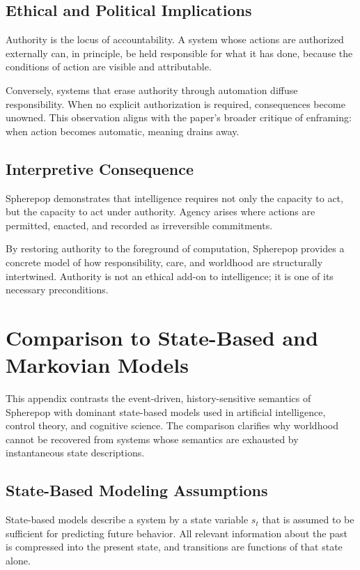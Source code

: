 \documentclass[11pt]{article}
\begin{document}
\subsection{Ethical and Political Implications}

Authority is the locus of accountability. A system whose actions are authorized externally can, in principle, be held responsible for what it has done, because the conditions of action are visible and attributable.

Conversely, systems that erase authority through automation diffuse responsibility. When no explicit authorization is required, consequences become unowned. This observation aligns with the paper’s broader critique of enframing: when action becomes automatic, meaning drains away.

\subsection{Interpretive Consequence}

Spherepop demonstrates that intelligence requires not only the capacity to act, but the capacity to act under authority. Agency arises where actions are permitted, enacted, and recorded as irreversible commitments.

By restoring authority to the foreground of computation, Spherepop provides a concrete model of how responsibility, care, and worldhood are structurally intertwined. Authority is not an ethical add-on to intelligence; it is one of its necessary preconditions.

\section{Comparison to State-Based and Markovian Models}

This appendix contrasts the event-driven, history-sensitive semantics of Spherepop with dominant state-based models used in artificial intelligence, control theory, and cognitive science. The comparison clarifies why worldhood cannot be recovered from systems whose semantics are exhausted by instantaneous state descriptions.

\subsection{State-Based Modeling Assumptions}

State-based models describe a system by a state variable $s_t$ that is assumed to be sufficient for predicting future behavior. All relevant information about the past is compressed into the present state, and transitions are functions of that state alone.
\end{document}
